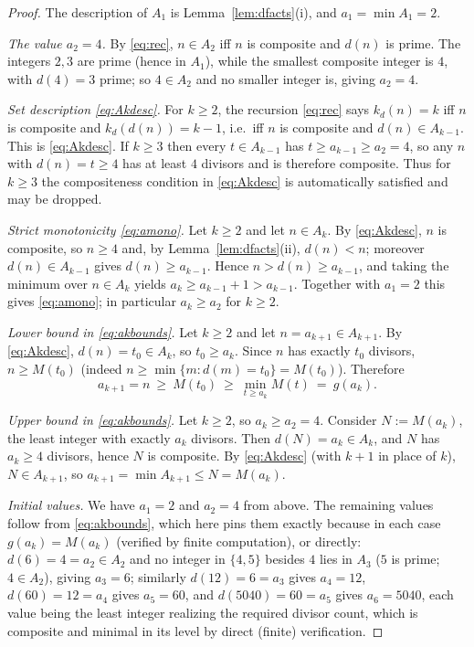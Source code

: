\documentclass{amsart}
\theoremstyle{definition}
\begin{document}
\begin{proof}
The description of $A_1$ is Lemma~\ref{lem:dfacts}(i), and $a_1=\min A_1=2$.

\emph{The value $a_2=4$.} By \eqref{eq:rec}, $n\in A_2$ iff $n$ is composite
and $d(n)$ is prime. The integers $2,3$ are prime (hence in $A_1$), while the
smallest composite integer is $4$, with $d(4)=3$ prime; so $4\in A_2$ and no
smaller integer is, giving $a_2=4$.

\emph{Set description \eqref{eq:Akdesc}.} For $k\ge2$, the recursion
\eqref{eq:rec} says $k_d(n)=k$ iff $n$ is composite and $k_d(d(n))=k-1$, i.e.\
iff $n$ is composite and $d(n)\in A_{k-1}$. This is \eqref{eq:Akdesc}. If
$k\ge3$ then every $t\in A_{k-1}$ has $t\ge a_{k-1}\ge a_2=4$, so any $n$ with
$d(n)=t\ge4$ has at least $4$ divisors and is therefore composite. Thus for
$k\ge3$ the compositeness condition in \eqref{eq:Akdesc} is automatically
satisfied and may be dropped.

\emph{Strict monotonicity \eqref{eq:amono}.} Let $k\ge2$ and let $n\in A_k$.
By \eqref{eq:Akdesc}, $n$ is composite, so $n\ge4$ and, by
Lemma~\ref{lem:dfacts}(ii), $d(n)<n$; moreover $d(n)\in A_{k-1}$ gives
$d(n)\ge a_{k-1}$. Hence $n>d(n)\ge a_{k-1}$, and taking the minimum over
$n\in A_k$ yields $a_k\ge a_{k-1}+1>a_{k-1}$. Together with $a_1=2$ this gives
\eqref{eq:amono}; in particular $a_k\ge a_2$ for $k\ge2$.

\emph{Lower bound in \eqref{eq:akbounds}.} Let $k\ge2$ and let
$n=a_{k+1}\in A_{k+1}$. By \eqref{eq:Akdesc}, $d(n)=t_0\in A_k$, so
$t_0\ge a_k$. Since $n$ has exactly $t_0$ divisors, $n\ge M(t_0)$ (indeed
$n\ge\min\{m:d(m)=t_0\}=M(t_0)$). Therefore
\[
a_{k+1}=n\ \ge\ M(t_0)\ \ge\ \min_{t\ge a_k}M(t)\ =\ g(a_k).
\]

\emph{Upper bound in \eqref{eq:akbounds}.} Let $k\ge2$, so $a_k\ge a_2=4$.
Consider $N:=M(a_k)$, the least integer with exactly $a_k$ divisors. Then
$d(N)=a_k\in A_k$, and $N$ has $a_k\ge4$ divisors, hence $N$ is composite. By
\eqref{eq:Akdesc} (with $k+1$ in place of $k$), $N\in A_{k+1}$, so
$a_{k+1}=\min A_{k+1}\le N=M(a_k)$.

\emph{Initial values.} We have $a_1=2$ and $a_2=4$ from above. The remaining
values follow from \eqref{eq:akbounds}, which here pins them exactly because in
each case $g(a_k)=M(a_k)$ (verified by finite computation), or directly:
$d(6)=4=a_2\in A_2$ and no integer in $\{4,5\}$ besides $4$ lies in $A_3$
($5$ is prime; $4\in A_2$), giving $a_3=6$; similarly $d(12)=6=a_3$ gives
$a_4=12$, $d(60)=12=a_4$ gives $a_5=60$, and $d(5040)=60=a_5$ gives $a_6=5040$,
each value being the least integer realizing the required divisor count, which
is composite and minimal in its level by direct (finite) verification.
\end{proof}
\end{document}
